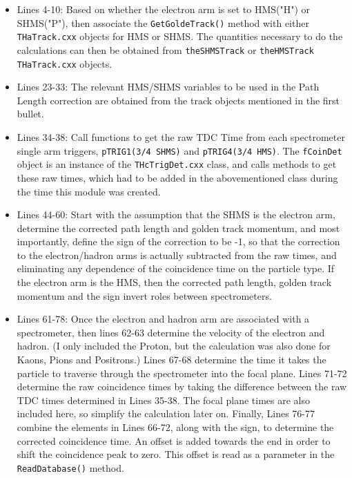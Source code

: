 \documentclass[14pt]{article}
\begin{document}
\begin{itemize}
\item Lines 4-10: Based on whether the electron arm is set to HMS("H") or SHMS("P"),
  then associate the \texttt{GetGoldeTrack()} method with either \texttt{THaTrack.cxx}
  objects for HMS or SHMS. The quantities necessary to do the calculations can then
  be obtained from \texttt{theSHMSTrack} or \texttt{theHMSTrack THaTrack.cxx} objects. 
\item Lines 23-33: The relevant HMS/SHMS variables to be used in the Path Length correction
  are obtained from the track objects mentioned in the first bullet.
\item Lines 34-38: Call functions to get the raw TDC Time from each spectrometer
  single arm triggers, \texttt{pTRIG1(3/4 SHMS)} and \texttt{pTRIG4(3/4 HMS)}. The
  \texttt{fCoinDet} object is an instance of the \texttt{THcTrigDet.cxx} class,
  and calls methods to get these raw times, which had to be added in the abovementioned
  class during the time this module was created.
\item Lines 44-60: Start with the assumption that the SHMS is the electron arm,
  determine the corrected path length and golden track momentum, and most importantly,
  define the sign of the correction to be -1, so that the correction to the
  electron/hadron arms is actually subtracted from the raw times, and eliminating any
  dependence of the coincidence time on the particle type. If the electron arm is the
  HMS, then the corrected path length, golden track momentum and the sign invert roles
  between spectrometers.
\item Lines 61-78: Once the electron and hadron arm are associated with a spectrometer,
  then lines 62-63 determine the velocity of the electron and hadron. (I only included
  the Proton, but the calculation was also done for Kaons, Pions and Positrons.)
  Lines 67-68 determine the time it takes the particle to traverse through the spectrometer
  into the focal plane. Lines 71-72 determine the raw coincidence times by taking the
  difference between the raw TDC times determined in Lines 35-38. The focal plane times
  are also included here, so simplify the calculation later on. Finally, Lines 76-77
  combine the elements in Lines 66-72, along with the sign, to determine the corrected
  coincidence time. An offset is added towards the end in order to shift the coincidence peak
  to zero. This offset is read as a parameter in the \texttt{ReadDatabase()} method.
  
\end{itemize}
    




 
\end{document}
